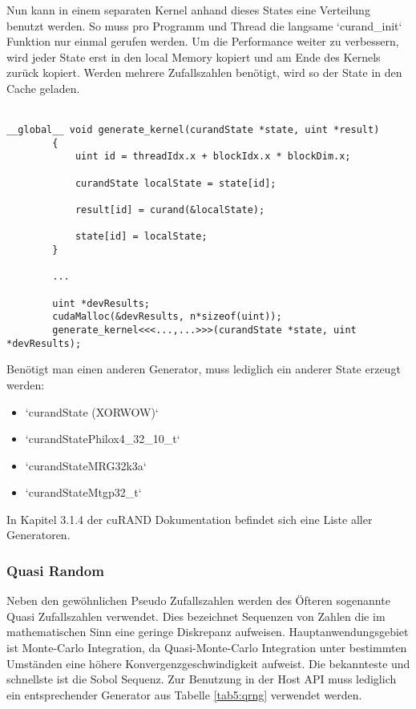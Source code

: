             Nun kann in einem separaten \Gls{Kernel} anhand dieses States eine Verteilung benutzt werden. So muss pro Programm und \Gls{Thread} die langsame \li`curand_init` Funktion nur einmal gerufen werden. Um die Performance weiter zu verbessern, wird jeder State erst in den \gls{local Memory} kopiert und am Ende des \Glspl{Kernel} zurück kopiert. Werden mehrere Zufallszahlen benötigt, wird so der State in den Cache geladen.  \\ \\
            \begin{lstlisting}[caption=cuRAND: Device API Generierung]
        __global__ void generate_kernel(curandState *state, uint *result)
        {
            uint id = threadIdx.x + blockIdx.x * blockDim.x;

            curandState localState = state[id];

            result[id] = curand(&localState);
				
            state[id] = localState;
        }
			
        ...
			
        uint *devResults;
        cudaMalloc(&devResults, n*sizeof(uint));
        generate_kernel<<<...,...>>>(curandState *state, uint *devResults);
            \end{lstlisting}
			
            Benötigt man einen anderen Generator, muss lediglich ein anderer State erzeugt werden:
            \begin{itemize}
                \item \li`curandState (XORWOW)`
                \item \li`curandStatePhilox4_32_10_t`
                \item \li`curandStateMRG32k3a`
                \item \li`curandStateMtgp32_t`
            \end{itemize}
			
            In Kapitel 3.1.4 der cuRAND Dokumentation befindet sich eine Liste aller Generatoren. \autocite{curandDoc}
					
            \subsubsection{Quasi Random} 
            Neben den gewöhnlichen Pseudo Zufallszahlen werden des Öfteren sogenannte Quasi Zufallszahlen verwendet. Dies bezeichnet Sequenzen von Zahlen die im mathematischen Sinn eine geringe Diskrepanz aufweisen. Hauptanwendungsgebiet ist Monte-Carlo Integration, da Quasi-Monte-Carlo Integration unter bestimmten Umständen eine höhere Konvergenzgeschwindigkeit aufweist. Die bekannteste und schnellste ist die Sobol Sequenz. Zur Benutzung in der Host \Gls{API} muss lediglich ein entsprechender Generator aus Tabelle \ref{tab5:qrng} verwendet werden.
			
